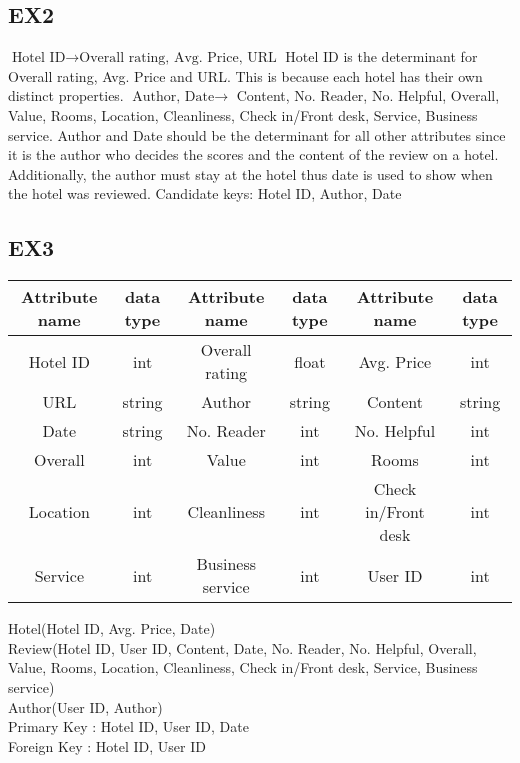 \documentclass{article}
\begin{document}
	\subsection{EX2}
	\begin{math}
		\textrm{Hotel ID}
		\rightarrow
		\textrm{Overall rating, Avg. Price, URL}
	\end{math}
	\newline
	Hotel ID is the determinant for Overall rating, Avg. Price and URL. This is because each hotel has their own distinct properties.
	\newline
	\begin{math}
		\textrm{Author, Date}
		\rightarrow
	\end{math}
	Content, No. Reader, No. Helpful, Overall, Value, Rooms, Location, Cleanliness, Check in/Front desk, Service, Business service.
	\newline
	Author and Date should be the determinant for all other attributes since it is the author who decides the scores and the content of the review on a hotel. Additionally, the author must stay at the hotel thus date is used to show when the hotel was reviewed.
	\newline
	Candidate keys:
	\newline
	Hotel ID, Author, Date
	\subsection{EX3}
	\begin{center}
		\begin{tabular}{||c c | c c | c c ||} 
			\hline
			Attribute name & data type & Attribute name & data type & Attribute name & data type \\
			\hline
			Hotel ID & int & Overall rating & float & Avg. Price & int \\ 
			URL & string & Author & string & Content & string \\ 
			Date & string & No. Reader & int & No. Helpful & int \\ 
			Overall & int & Value & int & Rooms & int \\
			Location & int & Cleanliness & int & Check in/Front desk & int \\
			Service & int & Business service & int & User ID & int \\
			\hline
		\end{tabular}
	\end{center}
	Hotel(Hotel ID, Avg. Price, Date) \\
	Review(Hotel ID, User ID, Content, Date, No. Reader, No. Helpful, Overall, Value, Rooms, Location, Cleanliness, Check in/Front desk, Service, Business service) \\
	Author(User ID, Author) \\
	Primary Key : Hotel ID, User ID, Date \\
	Foreign Key : Hotel ID, User ID \\
	
\end{document}
